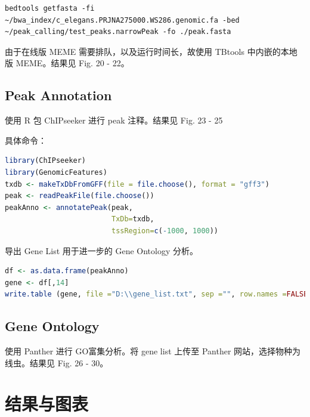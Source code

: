 \documentclass[UTF8]{ctexart}
\begin{document}
\begin{lstlisting}
bedtools getfasta -fi ~/bwa_index/c_elegans.PRJNA275000.WS286.genomic.fa -bed ~/peak_calling/test_peaks.narrowPeak -fo ./peak.fasta
\end{lstlisting}

由于在线版 MEME 需要排队，以及运行时间长，故使用 TBtools 中内嵌的本地版 MEME。结果见 Fig. 20 - 22。

\subsection{Peak Annotation}

使用 R 包 ChIPseeker 进行 peak 注释。结果见 Fig. 23 - 25

具体命令：

\begin{lstlisting}[language=R]
library(ChIPseeker)
library(GenomicFeatures)
txdb <- makeTxDbFromGFF(file = file.choose(), format = "gff3")
peak <- readPeakFile(file.choose())
peakAnno <- annotatePeak(peak,
                         TxDb=txdb,
                         tssRegion=c(-1000, 1000))
\end{lstlisting}

导出 Gene List 用于进一步的 Gene Ontology 分析。

\begin{lstlisting}[language=R]
df <- as.data.frame(peakAnno)
gene <- df[,14]
write.table (gene, file ="D:\\gene_list.txt", sep ="", row.names =FALSE, col.names =FALSE, quote =FALSE)
\end{lstlisting}

\subsection{Gene Ontology}
使用 Panther 进行 GO富集分析。将 gene list 上传至 Panther 网站，选择物种为线虫。结果见 Fig. 26 - 30。

\section{结果与图表}


\end{document}
